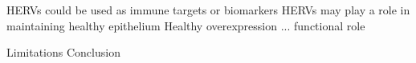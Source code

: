 HERVs could be used as immune targets or biomarkers
HERVs may play a role in maintaining healthy epithelium
Healthy overexpression ... functional role

Limitations
Conclusion
